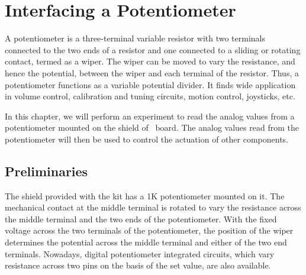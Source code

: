 \chapter{Interfacing a Potentiometer}
\thispagestyle{empty}
\label{potmeter}

\newcommand{\LocPotfig}{\Origin/user-code/pot/figures}
\newcommand{\LocPotscicode}{\Origin/user-code/pot/scilab}
\newcommand{\LocPotscibrief}[1]{{\tt
    \seqsplit{Origin/user-code/pot/scilab/#1}}, 
see \fnrefp{fn:file-loc}}
\newcommand{\LocPotardcode}{\Origin/user-code/pot/arduino}
\newcommand{\LocPotardbrief}[1]{{\tt
    \seqsplit{Origin/user-code/pot/arduino/#1}},
see \fnrefp{fn:file-loc}}

\newcommand{\LocPotpycode}{\Origin/user-code/pot/python}
\newcommand{\LocPotpybrief}[1]{{\tt
    \seqsplit{Origin/user-code/pot/python/#1}},
see \fnrefp{fn:file-loc}}

\newcommand{\LocPotjuliacode}{\Origin/user-code/pot/julia}
\newcommand{\LocPotjuliabrief}[1]{{\tt
    \seqsplit{Origin/user-code/pot/julia/#1}},
see \fnrefp{fn:file-loc}}

\newcommand{\LocPotOpenModelicacode}{\Origin/user-code/pot/OpenModelica}
\newcommand{\LocPotOpenModelicabrief}[1]{{\tt
    \seqsplit{Origin/user-code/pot/OpenModelica/#1}},
see \fnrefp{fn:file-loc}}

A potentiometer is a three-terminal variable resistor with two
terminals connected to the two ends of a resistor and one connected to
a sliding or rotating contact, termed as a wiper. The wiper can be
moved to vary the resistance, and hence the potential, between the
wiper and each terminal of the resistor. Thus, a potentiometer
functions as a variable potential divider. It finds wide application
in volume control, calibration and tuning circuits, motion control,
joysticks, etc.

In this chapter, we will perform an experiment to read the analog
values from a potentiometer mounted on the shield of \arduino\
board. The analog values read from the potentiometer will then be
used to control the actuation of other components.

\section{Preliminaries}
The shield provided with the kit has a 1K potentiometer mounted on
it. The mechanical contact at the middle terminal is rotated to vary
the resistance across the middle terminal and the two ends of the
potentiometer. With the fixed voltage across the two terminals of the
potentiometer, the position of the wiper determines the potential
across the middle terminal and either of the two end
terminals. Nowadays, digital potentiometer integrated circuits, which
vary resistance across two pins on the basis of the set value, are
also available.

